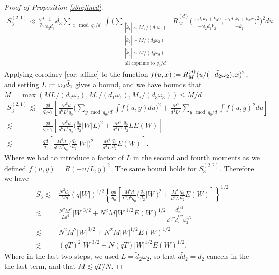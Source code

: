 \begin{proof}[Proof of Proposition \ref{s3refined}]
    \begin{align*}
        S_3^{(2,1)}\ll
        \frac{qd}{q_0} \frac{1}{\omega_3\tilde{d_3}}\tilde{d_3} \sum_{\substack{\tilde{x} \mod q_0/d} }\int\Bigg(\sum_{\substack{|\tilde{k}_1|\sim M_1/(d_1\omega_1),\\|\tilde{k}_2|\sim M/(d_2\omega_2)\\|\tilde{k}_3|\sim M/(d_3\omega_3)\\
        \textrm{all coprime to $q_0/d$}}}
        \tilde{R}_M^{(d)}\Big(\frac{\omega_1\tilde{d}_1\tilde{k}_1+\tilde{k}_3\tilde{u}}{-\omega_2\tilde{d}_2\tilde{k}_2},\frac{\omega_1\tilde{d}_1\tilde{k}_1+\tilde{k}_3 \tilde{x}}{-\tilde{k}_2}\Big)^2\Bigg)^2 d\tilde{u}.
    \end{align*}
    Applying corollary \ref{cor: affine} to the function $f(u,x)\mathrel{\mathop:}= R_M^{(d)}(u/(-\tilde{d}_2\omega_2),x)^2$, and setting $L\mathrel{\mathop:}=\omega_2\tilde{d}_2$ gives a bound, and we have bounds that $\tilde{M} = \max(ML/(d_2\omega_2) ,M_1/(d_1\omega_1),M_3/(d_3\omega_3))\leq M/d $
    \begin{align*}
        S_3^{(2,1)}\lesssim &  \frac{qd}{q_0\omega_3}\left[\frac{M^6d}{d^6L^4q_0}\Big(\sum_{y \mod q_0/d } \int f(u,y) du\Big)^2  + \frac{M^4}{d^4L^2}\sum_{y\mod q_0/d} \int f(u,y)^2 du
        \right]\\
        \lesssim& \frac{qd}{q_0\omega_3}\left[\frac{M^6d}{d^6L^4q_0}\Big(\frac{q_0}{d_2}|W|L)^2  + \frac{M^4}{d^4L^2}\frac{q_0}{d_2}LE(W)
        \right]\\
        \lesssim & \frac{qd}{q_0}\left[\frac{M^6d}{d^6L^2q_0}\Big(\frac{q_0}{d_2}|W|)^2  + \frac{M^4}{d^4L}\frac{q_0}{d_2}E(W)\right].
    \end{align*}
    Where we had to introduce a factor of $L$ in the second and fourth moments as we defined $f(u,y) = R(-u/L,y)^2$. 
    The same bound holds for $S^{(2,2)}_3$.
    Therefore we have \begin{align*}
        S_3\lesssim &\frac{N^2 d_2}{Mq} (q|W|)^{1/2}  \left\{\frac{qd}{q_0}\left[\frac{M^6d}{L^2d^6q_0}\Big(\frac{q_0}{d_2}|W|)^2  + \frac{M^4}{d^4L}\frac{q_0}{d_2}E(W)\right]\right\}^{1/2}\\
        \lesssim& \frac{N^2M^2}{Ld^2}|W|^{3/2} + N^2M|W|^{1/2}E(W)^{1/2}\frac{d_2^{1/2}}{d^{3/2}\tilde{d}_2^{1/2}\omega_2^{1/2}}\\
        \lesssim& N^2M^2|W|^{3/2} + N^2M|W|^{1/2}E(W)^{1/2}\\
        \lesssim& (qT)^2|W|^{3/2} + N(qT)|W|^{1/2}E(W)^{1/2}.
    \end{align*}
    Where in the last two steps, we used $L=\tilde{d}_2\omega_2$, so that $d\tilde{d}_2=d_2$ cancels in the the last term, and that $M\lesssim qT/N$.
\end{proof}
